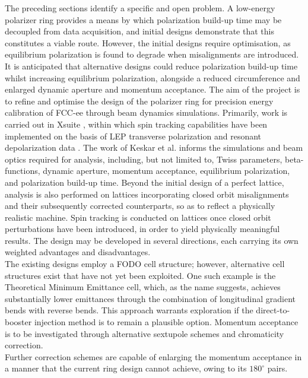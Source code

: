 \documentclass[%
 aip,
 amsmath,amssymb,
 reprint,%
superscriptaddress
]{revtex4-2}
\begin{document}
The preceding sections identify a specific and open problem.
A low-energy polarizer ring provides a means by which polarization build-up time may be decoupled from data acquisition, and initial designs demonstrate that this constitutes a viable route.\cite{keskar_bartosik_carli_2026}
However, the initial designs require optimisation, as equilibrium polarization is found to degrade when misalignments are introduced.
It is anticipated that alternative designs could reduce polarization build-up time whilst increasing equilibrium polarization, alongside a reduced circumference and enlarged dynamic aperture and momentum acceptance.
The aim of the project is to refine and optimise the design of the polarizer ring for precision energy calibration of FCC-ee through beam dynamics simulations.
Primarily, work is carried out in Xsuite \cite{iadarola_hb23}, within which spin tracking capabilities have been implemented on the basis of LEP transverse polarization and resonant depolarization data \cite{wenninger_iadarola_2026,iadarola:ipac2026-mop1028}.
The work of Keskar et al.\cite{keskar_bartosik_carli_2026} informs the simulations and beam optics required for analysis, including, but not limited to, Twiss parameters, beta-functions, dynamic aperture, momentum acceptance, equilibrium polarization, and polarization build-up time.
Beyond the initial design of a perfect lattice, analysis is also performed on lattices incorporating closed orbit misalignments and their subsequently corrected counterparts, so as to reflect a physically realistic machine.
Spin tracking is conducted on lattices once closed orbit perturbations have been introduced, in order to yield physically meaningful results.
The design may be developed in several directions, each carrying its own weighted advantages and disadvantages.
\\
The existing designs employ a FODO cell structure; however, alternative cell structures exist that have not yet been exploited.
One such example is the Theoretical Minimum Emittance cell, which, as the name suggests, achieves substantially lower emittances through the combination of longitudinal gradient bends with reverse bends\cite{riemann_2019}.
This approach warrants exploration if the direct-to-booster injection method is to remain a plausible option\cite{wolski_2014_book}.
Momentum acceptance is to be investigated through alternative sextupole schemes and chromaticity correction.
\\
Further correction schemes are capable of enlarging the momentum acceptance in a manner that the current ring design cannot achieve, owing to its $180^\circ$ pairs\cite{4124050,Takao:IPAC2014-THPRO066}.
\end{document}
